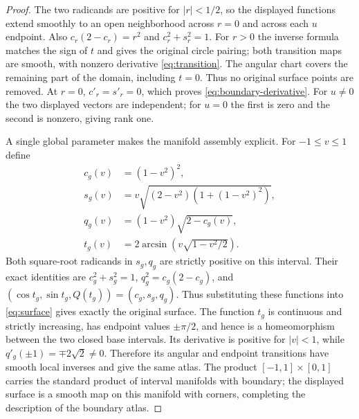 \documentclass[11pt,a4paper]{article}
\theoremstyle{definition}\newtheorem{definition}[theorem]{Definition}
\theoremstyle{remark}\newtheorem{remark}[theorem]{Remark}
\begin{document}
\begin{proof}
The two radicands are positive for $|r|<1/2$, so the displayed functions
extend smoothly to an open neighborhood across $r=0$ and across each
$u$ endpoint. Also $c_r(2-c_r)=r^2$ and $c_r^2+s_r^2=1$.
For $r>0$ the inverse formula matches the sign of $t$ and gives the original
circle pairing; both transition maps are smooth, with nonzero derivative
\eqref{eq:transition}. The angular chart covers the remaining part of the
domain, including $t=0$. Thus no original surface points are removed.
At $r=0$, $c'_r=s'_r=0$, which proves \eqref{eq:boundary-derivative}.
For $u\ne0$ the two displayed vectors are independent; for $u=0$ the
first is zero and the second is nonzero, giving rank one.

A single global parameter makes the manifold assembly explicit. For
$-1\leq v\leq1$ define
\begin{align*}
 c_g(v)&=(1-v^2)^2,\\
 s_g(v)&=v\sqrt{(2-v^2)(1+(1-v^2)^2)},\\
 q_g(v)&=(1-v^2)\sqrt{2-c_g(v)},\\
 t_g(v)&=2\arcsin\!\left(v\sqrt{1-v^2/2}\right).
\end{align*}
Both square-root radicands in $s_g,q_g$ are strictly positive on this
interval. Their exact identities are $c_g^2+s_g^2=1$,
$q_g^2=c_g(2-c_g)$, and $(\cos t_g,\sin t_g,Q(t_g))=(c_g,s_g,q_g)$.
Thus substituting these functions into \eqref{eq:surface} gives exactly
the original surface. The function $t_g$ is continuous and strictly
increasing, has endpoint values $\pm\pi/2$, and hence is a homeomorphism
between the two closed base intervals. Its derivative is positive for
$|v|<1$, while $q'_g(\pm1)=\mp2\sqrt2\ne0$. Therefore its angular and
endpoint transitions have smooth local inverses and give the same atlas.
The product $[-1,1]\times[0,1]$ carries the standard product of interval
manifolds with boundary; the displayed surface is a smooth map on this
manifold with corners, completing the description of the boundary atlas.

\end{proof}
\end{document}
